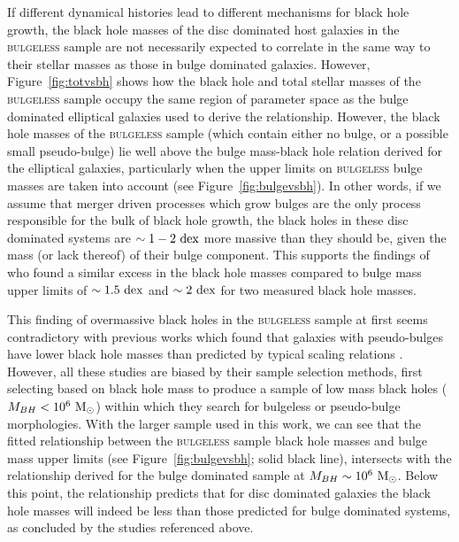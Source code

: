 {If different dynamical histories lead to different mechanisms for black hole growth, the black hole masses of the disc dominated host galaxies in the \textsc{bulgeless} sample are not necessarily expected to correlate in the same way to their stellar masses as those in bulge dominated galaxies. However, Figure~\ref{fig:totvsbh} shows how the black hole and total stellar masses of the \textsc{bulgeless} sample occupy the same region of parameter space as the bulge dominated elliptical galaxies used to derive the \citet{haringrix04} relationship. However, the black hole masses of the \textsc{bulgeless} sample (which contain either no bulge, or a possible small pseudo-bulge) lie well above the bulge mass-black hole relation derived for the \citet{haringrix04} elliptical galaxies, particularly when the upper limits on \textsc{bulgeless} bulge masses are taken into account (see Figure~\ref{fig:bulgevsbh}). In other words, if we assume that merger driven processes which grow bulges are the only process responsible for the bulk of black hole growth, the black holes in these disc dominated systems are $\sim1-2~\rm{dex}$ more massive than they should be, given the mass (or lack thereof) of their bulge component. This supports the findings of \citet{Simmons13} who found a similar excess in the black hole masses compared to bulge mass upper limits of $\sim 1.5~\rm{dex}$ and $\sim 2~\rm{dex}$ for two measured black hole masses. 

This finding of overmassive black holes in the \textsc{bulgeless} sample at first seems contradictory with previous works which found that galaxies with pseudo-bulges have lower black hole masses than predicted by typical scaling relations \citep[see work by][]{greene08, hu09, jiang11a, mathur12, ho14}. However, all these studies are biased by their sample selection methods, first selecting based on black hole mass to produce a sample of low mass black holes ($M_{BH} < 10^6 ~\rm{M}_{\odot}$) within which they search for bulgeless or pseudo-bulge morphologies. With the larger sample used in this work, we can see that the fitted relationship between the \textsc{bulgeless} sample black hole masses and bulge mass upper limits (see Figure~\ref{fig:bulgevsbh}; solid black line), intersects with the relationship derived for the bulge dominated \citet{haringrix04} sample at $M_{BH} \sim 10^{6} ~\rm{M}_{\odot}$. Below this point, the relationship predicts that for disc dominated galaxies the black hole masses will indeed be less than those predicted for bulge dominated systems, as concluded by the studies referenced above. 

}

